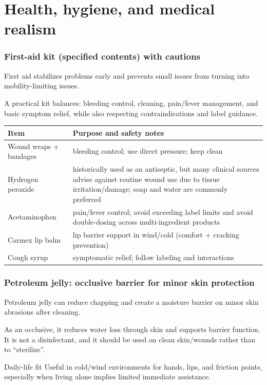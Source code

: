 \section{Health, hygiene, and medical realism}

\begin{frame}[t]
  \frametitle{First-aid kit (specified contents) with cautions}
  \justifying
   First aid stabilizes problems early and prevents small issues from turning into mobility-limiting issues.

  \vspace{0.5em}
   A practical kit balances: bleeding control, cleaning, pain/fever management, and basic symptom relief, while also respecting contraindications and label guidance.

  \vspace{0.8em}
  \DenseBodySize
  \begin{table}
    \centering
    \begin{tabularx}{\textwidth}{@{}lX@{}}
      \toprule
      \textbf{Item} & \textbf{Purpose and safety notes} \\
      \midrule
      Wound wraps + bandages & bleeding control; use direct pressure; keep clean \\
      Hydrogen peroxide & historically used as an antiseptic, but many clinical sources advise against routine wound use due to tissue irritation/damage; soap and water are commonly preferred~\cite{peroxide_utah,peroxide_cleveland} \\
      Acetaminophen & pain/fever control; avoid exceeding label limits and avoid double-dosing across multi-ingredient products~\cite{fda_acetaminophen} \\
      Carmex lip balm & lip barrier support in wind/cold (comfort + cracking prevention) \\
      Cough syrup & symptomatic relief; follow labeling and interactions \\
      \bottomrule
    \end{tabularx}
  \end{table}
\end{frame}

\begin{frame}[t]
  \frametitle{Petroleum jelly: occlusive barrier for minor skin protection}
  \justifying
   Petroleum jelly can reduce chapping and create a moisture barrier on minor skin abrasions after cleaning.

  \vspace{0.5em}
   As an occlusive, it reduces water loss through skin and supports barrier function. It is not a disinfectant, and it should be used on clean skin/wounds rather than to ``sterilize''.

  \vspace{0.8em}
  \begin{block}{Daily-life fit}
    Useful in cold/wind environments for hands, lips, and friction points, especially when living alone implies limited immediate assistance.
  \end{block}
\end{frame}

